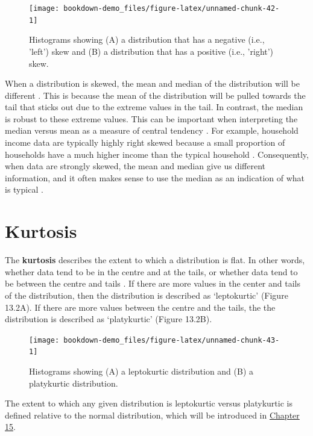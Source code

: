 \documentclass[
  openany]{scrbook}
\begin{document}
\begin{figure}
\texttt{[image: bookdown-demo\_files/figure-latex/unnamed-chunk-42-1]} \caption{Histograms showing (A) a distribution that has a negative (i.e., 'left') skew and (B) a distribution that has a positive (i.e., 'right') skew.}\label{fig:unnamed-chunk-42}
\end{figure}

When a distribution is skewed, the mean and median of the distribution will be different \citep{Sokal1995}.
This is because the mean of the distribution will be pulled towards the tail that sticks out due to the extreme values in the tail.
In contrast, the median is robust to these extreme values.
This can be important when interpreting the median versus mean as a measure of central tendency \citep{Reichmann1970}.
For example, household income data are typically highly right skewed because a small proportion of households have a much higher income than the typical household \citep{Mcdonald2013}.
Consequently, when data are strongly skewed, the mean and median give us different information, and it often makes sense to use the median as an indication of what is typical \citep{Chiripanhura2011}.

\hypertarget{kurtosis}{%
\section{Kurtosis}\label{kurtosis}}

The \textbf{kurtosis} describes the extent to which a distribution is flat.
In other words, whether data tend to be in the centre and at the tails, or whether data tend to be between the centre and tails \citep{Sokal1995}.
If there are more values in the center and tails of the distribution, then the distribution is described as `leptokurtic' (Figure 13.2A).
If there are more values between the centre and the tails, the the distribution is described as `platykurtic' (Figure 13.2B).

\begin{figure}
\texttt{[image: bookdown-demo\_files/figure-latex/unnamed-chunk-43-1]} \caption{Histograms showing (A) a leptokurtic distribution and (B) a platykurtic distribution.}\label{fig:unnamed-chunk-43}
\end{figure}

The extent to which any given distribution is leptokurtic versus platykurtic is defined relative to the normal distribution, which will be introduced in \protect\hyperlink{Chapter_15}{Chapter 15}.
\end{document}

